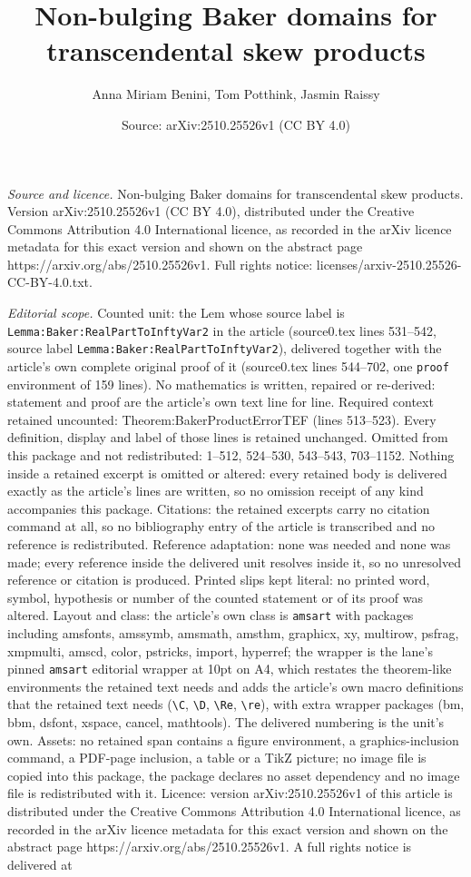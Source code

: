 \documentclass[10pt,a4paper]{amsart}
\title[Non-bulging Baker domains for transcendental skew products]{Non-bulging Baker domains for transcendental skew products}
\author{Anna Miriam Benini, Tom Potthink, Jasmin Raissy}
\date{Source: arXiv:2510.25526v1 (CC BY 4.0)}
\begin{document}
\maketitle

\noindent\emph{Source and licence.} Non-bulging Baker domains for transcendental skew products. Version arXiv:2510.25526v1 (CC BY 4.0), distributed under the Creative Commons Attribution 4.0 International licence, as recorded in the arXiv licence metadata for this exact version and shown on the abstract page https://arxiv.org/abs/2510.25526v1. Full rights notice: licenses/arxiv-2510.25526-CC-BY-4.0.txt.\par\smallskip

\noindent\textit{Editorial scope.} Counted unit: the Lem whose source label is \texttt{Lemma:Baker:RealPartToInftyVar2} in the article (source0.tex lines 531--542, source label \texttt{Lemma:Baker:RealPartToInftyVar2}), delivered together with the article's own complete original proof of it (source0.tex lines 544--702, one \texttt{proof} environment of 159 lines). No mathematics is written, repaired or re-derived: statement and proof are the article's own text line for line. Required context retained uncounted: Theorem:BakerProductErrorTEF (lines 513--523). Every definition, display and label of those lines is retained unchanged. Omitted from this package and not redistributed: 1--512, 524--530, 543--543, 703--1152. Nothing inside a retained excerpt is omitted or altered: every retained body is delivered exactly as the article's lines are written, so no omission receipt of any kind accompanies this package. Citations: the retained excerpts carry no citation command at all, so no bibliography entry of the article is transcribed and no reference is redistributed. Reference adaptation: none was needed and none was made; every reference inside the delivered unit resolves inside it, so no unresolved reference or citation is produced. Printed slips kept literal: no printed word, symbol, hypothesis or number of the counted statement or of its proof was altered. Layout and class: the article's own class is \texttt{amsart} with packages including amsfonts, amssymb, amsmath, amsthm, graphicx, xy, multirow, psfrag, xmpmulti, amscd, color, pstricks, import, hyperref; the wrapper is the lane's pinned \texttt{amsart} editorial wrapper at 10pt on A4, which restates the theorem-like environments the retained text needs and adds the article's own macro definitions that the retained text needs (\texttt{\textbackslash C}, \texttt{\textbackslash D}, \texttt{\textbackslash Re}, \texttt{\textbackslash re}), with extra wrapper packages (bm, bbm, dsfont, xspace, cancel, mathtools). The delivered numbering is the unit's own. Assets: no retained span contains a figure environment, a graphics-inclusion command, a PDF-page inclusion, a table or a TikZ picture; no image file is copied into this package, the package declares no asset dependency and no image file is redistributed with it. Licence: version arXiv:2510.25526v1 of this article is distributed under the Creative Commons Attribution 4.0 International licence, as recorded in the arXiv licence metadata for this exact version and shown on the abstract page https://arxiv.org/abs/2510.25526v1. A full rights notice is delivered at 
\end{document}
